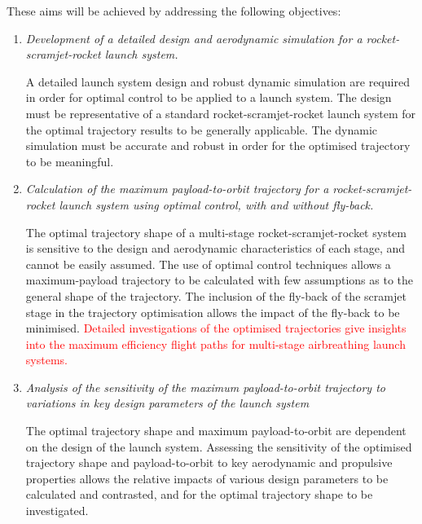     
\vspace*{10pt}
    \noindent These aims will be achieved by addressing the following objectives:
    \begin{enumerate}
    	 \item \emph{Development of a detailed design and aerodynamic simulation for a rocket-scramjet-rocket launch system.}
    	 
    	   A detailed launch system design and robust dynamic simulation are required in order for optimal control to be applied to a launch system. The design must be representative of a standard rocket-scramjet-rocket launch system for the optimal trajectory results to be generally applicable. The dynamic simulation must be accurate and robust in order for the optimised trajectory to be meaningful. \\

\item \emph{Calculation of the maximum payload-to-orbit trajectory for a rocket-scramjet-rocket launch system using optimal control, with and without fly-back.}

The optimal trajectory shape of a multi-stage rocket-scramjet-rocket system is sensitive to the design and aerodynamic characteristics of each stage, and cannot be easily assumed. The use of optimal control techniques allows a maximum-payload trajectory to be calculated with few assumptions as to the general shape of the trajectory. The inclusion of the fly-back of the scramjet stage in the trajectory optimisation allows the impact of the fly-back to be minimised. \textcolor{red}{Detailed investigations of the optimised trajectories give insights into the maximum efficiency flight paths for multi-stage airbreathing launch systems.} \\

      \item \emph{Analysis of the sensitivity of the maximum payload-to-orbit trajectory to variations in key design parameters of the launch system} 

	The optimal trajectory shape and maximum payload-to-orbit are dependent on the design of the launch system. 
	Assessing the sensitivity of the optimised trajectory shape and payload-to-orbit to key aerodynamic and propulsive properties allows the relative impacts of various design parameters to be calculated and contrasted, and for the optimal trajectory shape to be investigated. \\

    

    \end{enumerate}

